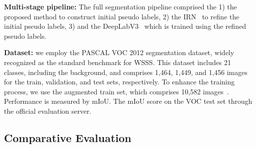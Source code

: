 \documentclass{article}
\begin{document}
\noindent
{\bf Multi-stage pipeline:}
The full segmentation pipeline comprised the 1) the proposed method to construct initial pseudo labels, 2) the IRN~\cite{IRN} to refine the initial pseudo labels, 3) and the DeepLabV3~\cite{DeepLabv3} which is trained using the refined pseudo labels.

\noindent
{\bf Dataset:}
we employ the PASCAL VOC 2012 segmentation dataset, widely recognized as the standard benchmark for WSSS. This dataset includes 21 classes, including the background, and comprises 1,464, 1,449, and 1,456 images for the train, validation, and test sets, respectively. To enhance the training process, we use the augmented train set, which comprises 10,582 images~\cite{VOCAugTrain}. Performance is measured by mIoU. The mIoU score on the VOC test set through the official evaluation server.

\subsection{Comparative Evaluation}
\label{sec:comp}
\end{document}
